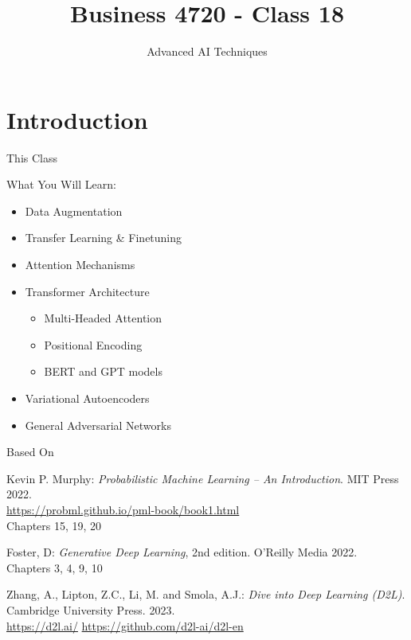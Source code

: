 \documentclass[ignorenonframetext,xcolor=x11names]{beamer}
\title{Business 4720 - Class 18}
\subtitle{Advanced AI Techniques}
\begin{document}
\begin{frame}[label=full]{}
  \titlepage
  \footnotesize
  
\end{frame}

\section{Introduction}

\begin{frame}[label=full]{This Class}

\begin{block}{What You Will Learn:}
\begin{itemize}
  \item Data Augmentation
  \item Transfer Learning \& Finetuning
  \item Attention Mechanisms
  \item Transformer Architecture
  \begin{itemize}
     \item Multi-Headed Attention
     \item Positional Encoding
     \item BERT and GPT models
  \end{itemize}
  \item Variational Autoencoders
  \item General Adversarial Networks
\end{itemize}
\end{block}
\end{frame}

\begin{frame}[label=full]{Based On}
\begin{block}{}
Kevin P. Murphy: \emph{Probabilistic Machine Learning -- An Introduction}. MIT Press 2022. \\
\vspace{0.5\baselineskip}
\url{https://probml.github.io/pml-book/book1.html} \\
\vspace{0.5\baselineskip}
Chapters 15, 19, 20
\end{block}

\begin{block}{}
Foster, D: \emph{Generative Deep Learning}, 2nd edition. O'Reilly Media 2022. \\
\vspace{0.5\baselineskip}
Chapters 3, 4, 9, 10
\end{block}

\begin{block}{}
Zhang, A., Lipton, Z.C., Li, M. and Smola, A.J.: \emph{Dive into Deep Learning (D2L)}. Cambridge University Press. 2023. \\

\url{https://d2l.ai/} \url{https://github.com/d2l-ai/d2l-en}
\end{block}
\end{frame}
\end{document}
